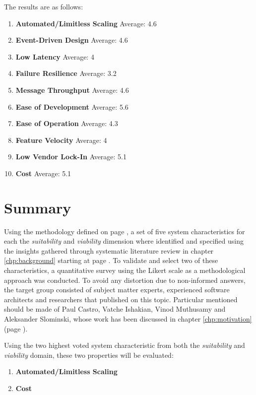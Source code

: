 \begin{minipage}{\textwidth}
    The results are as follows:
    
    \begin{enumerate}[nolistsep]\label{lst:surveyResults}
        \item \textbf{Automated/Limitless Scaling} Average: 4.6
        \item \textbf{Event-Driven Design} Average: 4.6
        \item \textbf{Low Latency} Average: 4
        \item \textbf{Failure Resilience} Average: 3.2
        \item \textbf{Message Throughput} Average: 4.6
        \item \textbf{Ease of Development} Average: 5.6
        \item \textbf{Ease of Operation} Average: 4.3
        \item \textbf{Feature Velocity} Average: 4
        \item \textbf{Low Vendor Lock-In} Average: 5.1
        \item \textbf{Cost} Average: 5.1
    \end{enumerate}
\end{minipage}

\section{Summary}

Using the methodology defined on page \pageref{sec:approach}, a set of five system characteristics for each the \textit{suitability} and \textit{viability} dimension where identified and specified using the insights gathered through systematic literature review in chapter \ref{chp:background} starting at page \pageref{chp:background}. To validate and select two of these characteristics, a quantitative survey using the Likert scale as a methodological approach was conducted. To avoid any distortion due to non-informed answers, the target group consisted of subject matter experts, experienced software architects and researchers that published on this topic. Particular mentioned should be made of Paul Castro, Vatche Ishakian, Vinod Muthusamy and Aleksander Slominski, whose work has been discussed in chapter \ref{chp:motivation} (page \pageref{castro}). 

Using the two highest voted system characteristic from both the \textit{suitability} and \textit{viability} domain, these two properties will be evaluated:
\begin{enumerate}[nolistsep]
    \item \textbf{Automated/Limitless Scaling}
    \item \textbf{Cost}
\end{enumerate}
